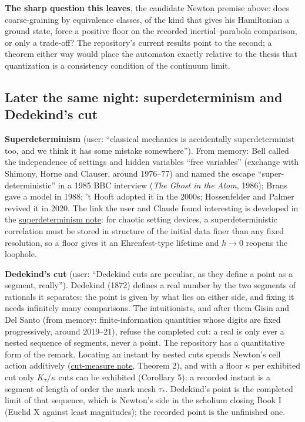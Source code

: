 \documentclass[11pt,a4paper]{article}
\begin{document}
\textbf{The sharp question this leaves}, the candidate Newton premise
above: does coarse-graining by equivalence classes, of the kind that
gives his Hamiltonian a ground state, force a positive floor on the
recorded inertial--parabola comparison, or only a trade-off? The
repository's current results point to the second; a theorem either way
would place the automaton exactly relative to the thesis that
quantization is a consistency condition of the continuum limit.

\hypertarget{later-the-same-night-superdeterminism-and-dedekinds-cut}{%
\subsection{Later the same night: superdeterminism and Dedekind's
cut}\label{later-the-same-night-superdeterminism-and-dedekinds-cut}}

\textbf{Superdeterminism} (user: ``classical mechanics is accidentally
superdeterminist too, and we think it has some mistake somewhere'').
From memory: Bell called the independence of settings and hidden
variables ``free variables'' (exchange with Shimony, Horne and Clauser,
around 1976--77) and named the escape ``super-deterministic'' in a 1985
BBC interview (\emph{The Ghost in the Atom}, 1986); Brans gave a model
in 1988; 't Hooft adopted it in the 2000s; Hossenfelder and Palmer
revived it in 2020. The link the user and Claude found interesting is
developed in the \href{superdeterminism-floor.md}{superdeterminism
note}: for chaotic setting devices, a superdeterministic correlation
must be stored in structure of the initial data finer than any fixed
resolution, so a floor gives it an Ehrenfest-type lifetime and \(h\to0\)
reopens the loophole.

\textbf{Dedekind's cut} (user: ``Dedekind cuts are peculiar, as they
define a point as a segment, really''). Dedekind (1872) defines a real
number by the two segments of rationals it separates: the point is given
by what lies on either side, and fixing it needs infinitely many
comparisons. The intuitionists, and after them Gisin and Del Santo (from
memory: finite-information quantities whose digits are fixed
progressively, around 2019--21), refuse the completed cut: a real is
only ever a nested sequence of segments, never a point. The repository
has a quantitative form of the remark. Locating an instant by nested
cuts spends Newton's cell action additively
(\href{cut-measure-newton.md}{cut-measure note}, Theorem 2), and with a
floor \(\kappa\) per exhibited cut only \(K_\tau/\kappa\) cuts can be
exhibited (Corollary 5): a recorded instant is a segment of length of
order the mark mesh \(\tau_*\). Dedekind's point is the completed limit
of that sequence, which is Newton's side in the scholium closing Book I
(Euclid X against least magnitudes); the recorded point is the
unfinished one.
\end{document}
